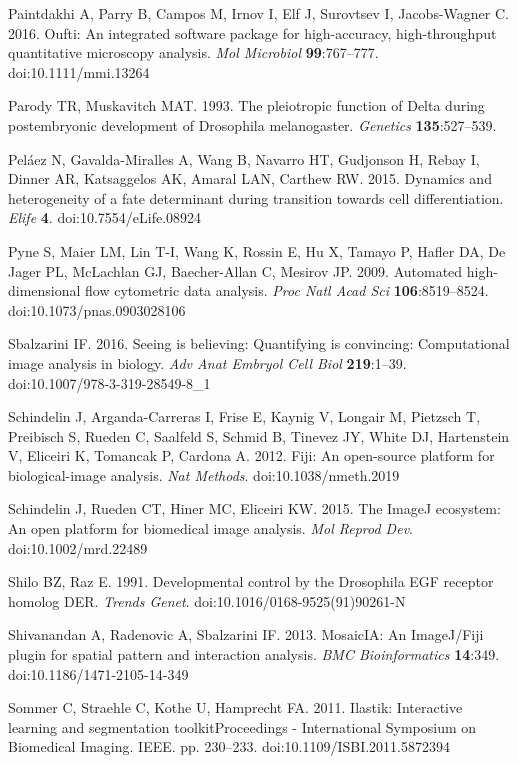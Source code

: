 Paintdakhi A, Parry B, Campos M, Irnov I, Elf J, Surovtsev I, Jacobs-Wagner C. 2016. Oufti: An integrated software package for high-accuracy, high-throughput quantitative microscopy analysis. \emph{Mol Microbiol} \textbf{99}:767--777. doi:10.1111/mmi.13264

Parody TR, Muskavitch MAT. 1993. The pleiotropic function of Delta during postembryonic development of Drosophila melanogaster. \emph{Genetics} \textbf{135}:527--539.

Peláez N, Gavalda-Miralles A, Wang B, Navarro HT, Gudjonson H, Rebay I, Dinner AR, Katsaggelos AK, Amaral LAN, Carthew RW. 2015. Dynamics and heterogeneity of a fate determinant during transition towards cell differentiation. \emph{Elife} \textbf{4}. doi:10.7554/eLife.08924

Pyne S, Maier LM, Lin T-I, Wang K, Rossin E, Hu X, Tamayo P, Hafler DA, De Jager PL, McLachlan GJ, Baecher-Allan C, Mesirov JP. 2009. Automated high-dimensional flow cytometric data analysis. \emph{Proc Natl Acad Sci} \textbf{106}:8519--8524. doi:10.1073/pnas.0903028106

Sbalzarini IF. 2016. Seeing is believing: Quantifying is convincing: Computational image analysis in biology. \emph{Adv Anat Embryol Cell Biol} \textbf{219}:1--39. doi:10.1007/978-3-319-28549-8\_1

Schindelin J, Arganda-Carreras I, Frise E, Kaynig V, Longair M, Pietzsch T, Preibisch S, Rueden C, Saalfeld S, Schmid B, Tinevez JY, White DJ, Hartenstein V, Eliceiri K, Tomancak P, Cardona A. 2012. Fiji: An open-source platform for biological-image analysis. \emph{Nat Methods}. doi:10.1038/nmeth.2019

Schindelin J, Rueden CT, Hiner MC, Eliceiri KW. 2015. The ImageJ ecosystem: An open platform for biomedical image analysis. \emph{Mol Reprod Dev}. doi:10.1002/mrd.22489

Shilo BZ, Raz E. 1991. Developmental control by the Drosophila EGF receptor homolog DER. \emph{Trends Genet}. doi:10.1016/0168-9525(91)90261-N

Shivanandan A, Radenovic A, Sbalzarini IF. 2013. MosaicIA: An ImageJ/Fiji plugin for spatial pattern and interaction analysis. \emph{BMC Bioinformatics} \textbf{14}:349. doi:10.1186/1471-2105-14-349

Sommer C, Straehle C, Kothe U, Hamprecht FA. 2011. Ilastik: Interactive learning and segmentation toolkitProceedings - International Symposium on Biomedical Imaging. IEEE. pp. 230--233. doi:10.1109/ISBI.2011.5872394

